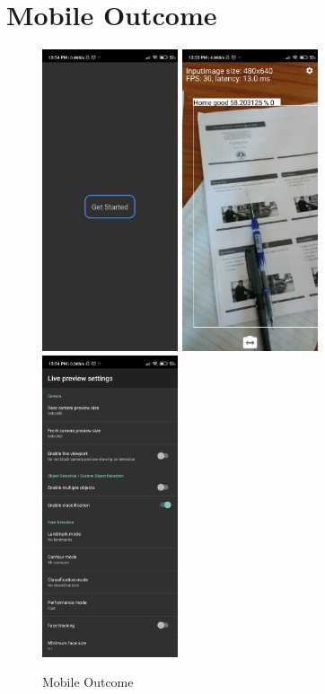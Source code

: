         \section{Mobile Outcome}
                \begin{center}
                        \begin{figure}[h]
                                \includegraphics[height=3.5in]{img/mobile1.jpg}
                                \includegraphics[height=3.5in]{img/mobile2.jpg}
                                \includegraphics[height=3.5in]{img/mobile3.jpg}
                                \caption{Mobile Outcome}
                        \end{figure}
                \end{center}
                